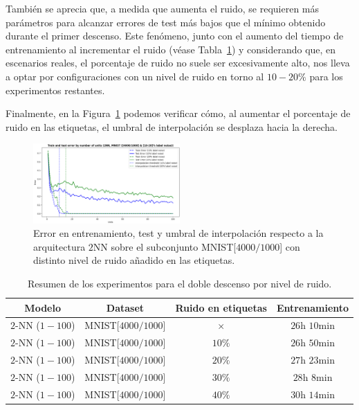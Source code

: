 También se aprecia que, a medida que aumenta el ruido, se requieren más parámetros para alcanzar errores de test más bajos que el mínimo obtenido durante el primer descenso. Este fenómeno, junto con el aumento del tiempo de entrenamiento al incrementar el ruido (véase Tabla~\ref{tab:noisewisedd}) y considerando que, en escenarios reales, el porcentaje de ruido no suele ser excesivamente alto, nos lleva a optar por configuraciones con un nivel de ruido en torno al $10-20\%$ para los experimentos restantes.\newline

Finalmente, en la Figura~\ref{fig:noise-wise-dd3} podemos verificar cómo, al aumentar el porcentaje de ruido en las etiquetas, el umbral de interpolación se desplaza hacia la derecha.\newline

\begin{figure}[h]
    \centering
    \includegraphics[width=0.5\textwidth]{img/experiments/noise-wise-dd3.png}
    \caption[Umbral de interpolación para el doble descenso con distintos niveles de ruido.]{Error en entrenamiento, test y umbral de interpolación respecto a la arquitectura $2$NN sobre el subconjunto MNIST[$4000/1000$] con distinto nivel de ruido añadido en las etiquetas.}\label{fig:noise-wise-dd3}
\end{figure}

\begin{table}[h!]
    \centering
    \begin{tabular}{|c|c|c|c|}
    \hline
    \textbf{Modelo}       & \textbf{Dataset} & \textbf{Ruido en etiquetas} & \textbf{Entrenamiento} \\ 
    \hline
    $2$-NN ($1-100$)          & MNIST[$4000/1000$]        & $\times$         & $26$h $10$min       \\ 
    $2$-NN ($1-100$)          & MNIST[$4000/1000$]        & $10\%$         & $26$h $50$min       \\ 
    $2$-NN ($1-100$)          & MNIST[$4000/1000$]        & $20\%$         & $27$h $23$min       \\ 
    $2$-NN ($1-100$)          & MNIST[$4000/1000$]        & $30\%$          & $28$h $8$min       \\ 
    $2$-NN ($1-100$)          & MNIST[$4000/1000$]       & $40\%$          & $30$h $14$min       \\  
    \hline
    \end{tabular}
    \caption[Resumen de los experimentos para el doble descenso por nivel de ruido.]{Resumen de los experimentos para el doble descenso por nivel de ruido.}
    \label{tab:noisewisedd}
    \end{table}

